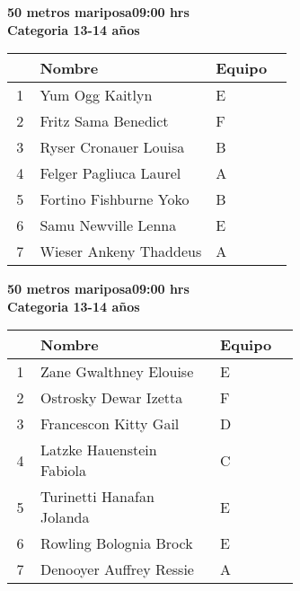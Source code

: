 \begin{minipage}{0.95\linewidth}\vspace{0.5cm} 
\begin{flushleft}
\textbf{
\hspace{-0.15cm}50 metros mariposa\hspace{1.5cm}09:00 hrs \\Categoria 13-14 años}\vspace{-0.2cm} 
\end{flushleft}
\begin{tabular}{cp{0.63\linewidth}l}
\hline
& \textbf{Nombre} & \textbf{Equipo} \\ \hline
1 & Yum Ogg Kaitlyn & E \\ 
2 & Fritz Sama Benedict & F \\ 
3 & Ryser Cronauer Louisa & B \\ 
4 & Felger Pagliuca Laurel & A \\ 
5 & Fortino Fishburne Yoko & B \\ 
6 & Samu Newville Lenna & E \\ 
7 & Wieser Ankeny Thaddeus & A \\ 
\end{tabular}
\end{minipage}
\begin{minipage}{0.95\linewidth}\vspace{0.5cm} 
\begin{flushleft}
\textbf{
\hspace{-0.15cm}50 metros mariposa\hspace{1.5cm}09:00 hrs \\Categoria 13-14 años}\vspace{-0.2cm} 
\end{flushleft}
\begin{tabular}{cp{0.63\linewidth}l}
\hline
& \textbf{Nombre} & \textbf{Equipo} \\ \hline
1 & Zane Gwalthney Elouise & E \\ 
2 & Ostrosky Dewar Izetta & F \\ 
3 & Francescon Kitty Gail & D \\ 
4 & Latzke Hauenstein Fabiola & C \\ 
5 & Turinetti Hanafan Jolanda & E \\ 
6 & Rowling Bolognia Brock & E \\ 
7 & Denooyer Auffrey Ressie & A \\ 
\end{tabular}
\end{minipage}
